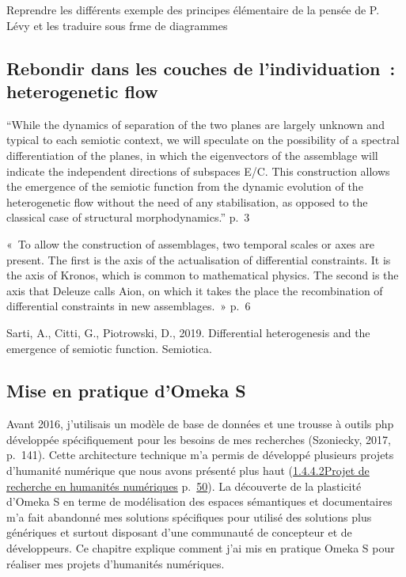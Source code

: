 \documentclass[
  letterpaper,
  DIV=11,
  numbers=noendperiod]{scrreprt}
\begin{document}
Reprendre les différents exemple des principes élémentaire de la pensée
de P. Lévy et les traduire sous frme de diagrammes

\hypertarget{rebondir-dans-les-couches-de-lindividuation-heterogenetic-flow}{%
\subsection{Rebondir dans les couches de l'individuation~: heterogenetic
flow}\label{rebondir-dans-les-couches-de-lindividuation-heterogenetic-flow}}

``While the dynamics of separation of the two planes are largely unknown
and typical to each semiotic context, we will speculate on the
possibility of a spectral differentiation of the planes, in which the
eigenvectors of the assemblage will indicate the independent directions
of subspaces E/C. This construction allows the emergence of the semiotic
function from the dynamic evolution of the heterogenetic flow without
the need of any stabilisation, as opposed to the classical case of
structural morphodynamics.'' p.~3

«~To allow the construction of assemblages, two temporal scales or axes
are present. The first is the axis of the actualisation of differential
constraints. It is the axis of Kronos, which is common to mathematical
physics. The second is the axis that Deleuze calls Aion, on which it
takes the place the recombination of differential constraints in new
assemblages.~» p.~6

Sarti, A., Citti, G., Piotrowski, D., 2019. Differential heterogenesis
and the emergence of semiotic function. Semiotica.

\hypertarget{sec-pratiquesOmk}{%
\subsection{Mise en pratique d'Omeka S}\label{sec-pratiquesOmk}}

Avant 2016, j'utilisais un modèle de base de données et une trousse à
outils php développée spécifiquement pour les besoins de mes recherches
(Szoniecky, 2017, p.~141). Cette architecture technique m'a permis de
développé plusieurs projets d'humanité numérique que nous avons présenté
plus haut (\protect\hyperlink{anchor-59}{1.4.4.2Projet de recherche en
humanités numériques} p.~\protect\hyperlink{anchor-59}{50}). La
découverte de la plasticité d'Omeka S en terme de modélisation des
espaces sémantiques et documentaires m'a fait abandonné mes solutions
spécifiques pour utilisé des solutions plus génériques et surtout
disposant d'une communauté de concepteur et de développeurs. Ce chapitre
explique comment j'ai mis en pratique Omeka S pour réaliser mes projets
d'humanités numériques.
\end{document}
